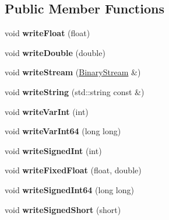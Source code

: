 \subsection*{Public Member Functions}
\begin{DoxyCompactItemize}
\item 
\mbox{\label{struct_binary_stream_af8029f8cd1e04c1580b9451758628483}} 
void {\bfseries write\+Float} (float)
\item 
\mbox{\label{struct_binary_stream_a2473b7d1aaf88c8bdb271e4f234ccf64}} 
void {\bfseries write\+Double} (double)
\item 
\mbox{\label{struct_binary_stream_a92a019df3c8c7a59500e480bc99e9b66}} 
void {\bfseries write\+Stream} (\mbox{\hyperlink{struct_binary_stream}{Binary\+Stream}} \&)
\item 
\mbox{\label{struct_binary_stream_afedd24854fbf5a1be8ccc10d6a4fc0df}} 
void {\bfseries write\+String} (std\+::string const \&)
\item 
\mbox{\label{struct_binary_stream_a012fe042732b1b80fba03fc3153017d2}} 
void {\bfseries write\+Var\+Int} (int)
\item 
\mbox{\label{struct_binary_stream_aa41d52ab266bf95dd6eeee8bddcc1e8c}} 
void {\bfseries write\+Var\+Int64} (long long)
\item 
\mbox{\label{struct_binary_stream_a9dd39cd3d7b4ddbb74c50e20ed9aa8fc}} 
void {\bfseries write\+Signed\+Int} (int)
\item 
\mbox{\label{struct_binary_stream_a6415dfd3c6415fd4159b99b983ff5a49}} 
void {\bfseries write\+Fixed\+Float} (float, double)
\item 
\mbox{\label{struct_binary_stream_a9a6cc7e158d0277be715a58404f69747}} 
void {\bfseries write\+Signed\+Int64} (long long)
\item 
\mbox{\label{struct_binary_stream_a82b7c8966fc67e231dfa0bf3df08a4ba}} 
void {\bfseries write\+Signed\+Short} (short)

\end{DoxyCompactItemize}
